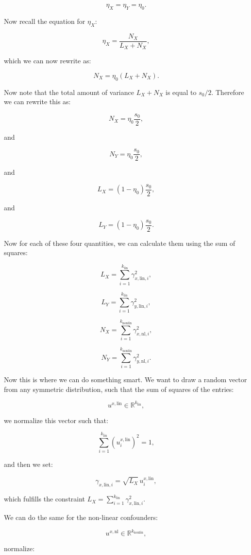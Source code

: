 \documentclass{article}
\begin{document}
\[
\eta_X = \eta_Y = \eta_0.
\]

\noindent
Now recall the equation for $\eta_X$:

\[
\eta_X = \frac{N_X}{L_X + N_X},
\]

\noindent
which we can now rewrite as:

\[
N_X = \eta_0 (L_X + N_X).
\]

\noindent
Now note that the total amount of variance $L_X + N_X$ is equal to $s_0/2$. Therefore we can rewrite this as:

\[
N_X = \eta_0 \frac{s_0}{2},
\]

and

\[
N_Y = \eta_0 \frac{s_0}{2},
\]

and

\[
L_X = (1 - \eta_0) \frac{s_0}{2},
\]

and

\[
L_Y = (1 - \eta_0) \frac{s_0}{2}.
\]

\noindent
Now for each of these four quantities, we can calculate them using the sum of squares:

\[
L_X = \sum_{i=1}^{k_{\text{lin}}} \gamma_{x,\text{lin},i}^2,
\]

\[
L_Y = \sum_{i=1}^{k_{\text{lin}}} \gamma_{y,\text{lin},i}^2,
\]

\[
N_X = \sum_{i=1}^{k_{\text{nonlin}}} \gamma_{x,\text{nl},i}^2,
\]

\[
N_Y = \sum_{i=1}^{k_{\text{nonlin}}} \gamma_{y,\text{nl},i}^2.
\]

\noindent
Now this is where we can do something smart. We want to draw a random vector from any symmetric distribution, such that the sum of squares of the entries:

\[
u^{x,\text{lin}} \in \mathbb{R}^{k_{\text{lin}}},
\]

\noindent
we normalize this vector such that:

\[
\sum_{i=1}^{k_{\text{lin}}} (u^{x,\text{lin}}_i)^2 = 1,
\]

\noindent
and then we set:

\[
\gamma_{x,\text{lin},i} = \sqrt{L_X}\, u^{x,\text{lin}}_i,
\]

\noindent
which fulfills the constraint $L_X = \sum_{i=1}^{k_{\text{lin}}} \gamma_{x,\text{lin},i}^2$.  

We can do the same for the non-linear confounders:

\[
u^{x,\text{nl}} \in \mathbb{R}^{k_{\text{nonlin}}},
\]

\noindent
normalize:
\end{document}
